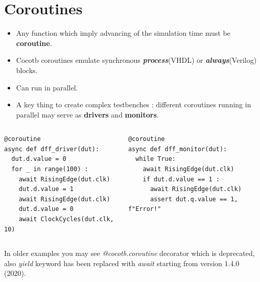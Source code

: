 \documentclass[aspectratio=169]{beamer}
\begin{document}
\section*{Coroutines}
\begin{frame}[fragile]{\secname}
  \scriptsize
  \begin{itemize}
    \item Any function which imply advancing of the simulation time must be {\bf coroutine}.
    \item Cocotb coroutines emulate synchronous {\it \bf process}(VHDL) or {\it \bf always}(Verilog) blocks.
    \item Can run in parallel. 
    \item A key thing to create complex testbenches : different coroutines running in parallel may serve as {\bf drivers} and {\bf monitors}.
  \end{itemize}

  \vspace*{-2mm}
  \begin{columns}
    \begin{column}{0.5\textwidth}

  \begin{verbatim}
@coroutine
async def dff_driver(dut):
  dut.d.value = 0
  for _ in range(100) : 
    await RisingEdge(dut.clk)
    dut.d.value = 1
    await RisingEdge(dut.clk)
    dut.d.value = 0
    await ClockCycles(dut.clk, 10)
  \end{verbatim}
      
    \end{column}

    \begin{column}{0.5\textwidth}

  \begin{verbatim}
@coroutine
async def dff_monitor(dut):
  while True:
    await RisingEdge(dut.clk)
    if dut.d.value == 1 :
      await RisingEdge(dut.clk)
      assert dut.q.value == 1, f"Error!"
  \end{verbatim}
    \end{column}
  \end{columns}

 In older examples you may see {\it @cocotb.coroutine} decorator which is deprecated, also {\it yield} keyword has been replaced with {\it await} starting from version 1.4.0 (2020).

\end{frame}
\end{document}
